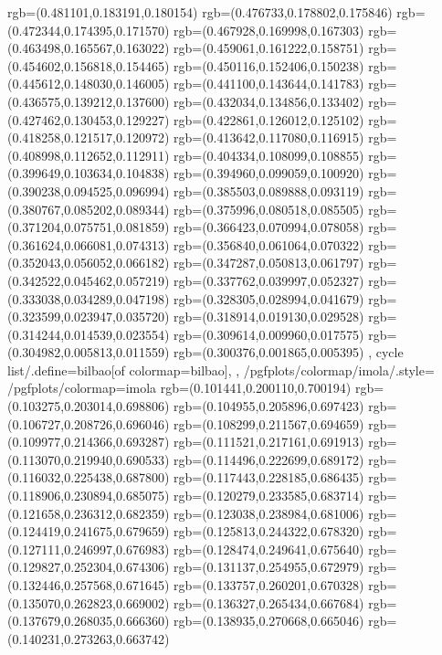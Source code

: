 {{{			rgb=(0.481101,0.183191,0.180154)
			rgb=(0.476733,0.178802,0.175846)
			rgb=(0.472344,0.174395,0.171570)
			rgb=(0.467928,0.169998,0.167303)
			rgb=(0.463498,0.165567,0.163022)
			rgb=(0.459061,0.161222,0.158751)
			rgb=(0.454602,0.156818,0.154465)
			rgb=(0.450116,0.152406,0.150238)
			rgb=(0.445612,0.148030,0.146005)
			rgb=(0.441100,0.143644,0.141783)
			rgb=(0.436575,0.139212,0.137600)
			rgb=(0.432034,0.134856,0.133402)
			rgb=(0.427462,0.130453,0.129227)
			rgb=(0.422861,0.126012,0.125102)
			rgb=(0.418258,0.121517,0.120972)
			rgb=(0.413642,0.117080,0.116915)
			rgb=(0.408998,0.112652,0.112911)
			rgb=(0.404334,0.108099,0.108855)
			rgb=(0.399649,0.103634,0.104838)
			rgb=(0.394960,0.099059,0.100920)
			rgb=(0.390238,0.094525,0.096994)
			rgb=(0.385503,0.089888,0.093119)
			rgb=(0.380767,0.085202,0.089344)
			rgb=(0.375996,0.080518,0.085505)
			rgb=(0.371204,0.075751,0.081859)
			rgb=(0.366423,0.070994,0.078058)
			rgb=(0.361624,0.066081,0.074313)
			rgb=(0.356840,0.061064,0.070322)
			rgb=(0.352043,0.056052,0.066182)
			rgb=(0.347287,0.050813,0.061797)
			rgb=(0.342522,0.045462,0.057219)
			rgb=(0.337762,0.039997,0.052327)
			rgb=(0.333038,0.034289,0.047198)
			rgb=(0.328305,0.028994,0.041679)
			rgb=(0.323599,0.023947,0.035720)
			rgb=(0.318914,0.019130,0.029528)
			rgb=(0.314244,0.014539,0.023554)
			rgb=(0.309614,0.009960,0.017575)
			rgb=(0.304982,0.005813,0.011559)
			rgb=(0.300376,0.001865,0.005395)
		},
	cycle list/.define={bilbao}{[of colormap=bilbao]},
	},
	/pgfplots/colormap/imola/.style={
		/pgfplots/colormap={imola}{%
			rgb=(0.101441,0.200110,0.700194)
			rgb=(0.103275,0.203014,0.698806)
			rgb=(0.104955,0.205896,0.697423)
			rgb=(0.106727,0.208726,0.696046)
			rgb=(0.108299,0.211567,0.694659)
			rgb=(0.109977,0.214366,0.693287)
			rgb=(0.111521,0.217161,0.691913)
			rgb=(0.113070,0.219940,0.690533)
			rgb=(0.114496,0.222699,0.689172)
			rgb=(0.116032,0.225438,0.687800)
			rgb=(0.117443,0.228185,0.686435)
			rgb=(0.118906,0.230894,0.685075)
			rgb=(0.120279,0.233585,0.683714)
			rgb=(0.121658,0.236312,0.682359)
			rgb=(0.123038,0.238984,0.681006)
			rgb=(0.124419,0.241675,0.679659)
			rgb=(0.125813,0.244322,0.678320)
			rgb=(0.127111,0.246997,0.676983)
			rgb=(0.128474,0.249641,0.675640)
			rgb=(0.129827,0.252304,0.674306)
			rgb=(0.131137,0.254955,0.672979)
			rgb=(0.132446,0.257568,0.671645)
			rgb=(0.133757,0.260201,0.670328)
			rgb=(0.135070,0.262823,0.669002)
			rgb=(0.136327,0.265434,0.667684)
			rgb=(0.137679,0.268035,0.666360)
			rgb=(0.138935,0.270668,0.665046)
			rgb=(0.140231,0.273263,0.663742)
}}}
